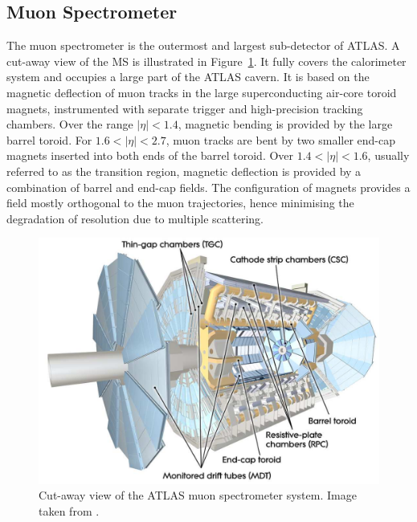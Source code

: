 \subsection{Muon Spectrometer}
\label{sec:MS}
The muon spectrometer is the outermost and largest sub-detector of ATLAS. 
A cut-away view of the MS is illustrated in Figure~\ref{fig:MS}.
It fully covers the	calorimeter system and occupies a large part of the ATLAS cavern. 
It is based on the magnetic deflection of muon tracks in the 
large superconducting air-core toroid magnets, instrumented with
separate trigger and high-precision tracking chambers. 
Over the range $|\eta|< 1.4$, magnetic bending is provided by the large 
barrel toroid. For $1.6 < |\eta|< 2.7$, muon tracks are bent by two smaller
end-cap magnets inserted into both ends of the barrel toroid. 
Over $1.4 < |\eta|< 1.6$, usually referred to as the transition region, 
magnetic deflection is provided by a combination of barrel and end-cap
fields. The configuration of magnets provides a field mostly orthogonal 
to the muon trajectories, hence minimising the degradation of 
resolution due to multiple scattering. 
\begin{figure}[bht]
	\begin{centering}	
	\includegraphics[width=.9\textwidth]{Detector/plots/Muon.png}
	\caption{Cut-away view of the ATLAS muon spectrometer system. Image taken from \cite{PERF-2007-01}.}
	\label{fig:MS}
	\end{centering}
\end{figure}

